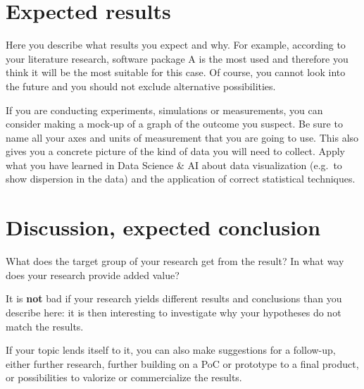 \documentclass[english]{hogent-article}
\begin{document}
\section{Expected results}%
\label{sec:expected-results}


Here you describe what results you expect and why. For example, according to your literature research, software package A is the most used and therefore you think it will be the most suitable for this case. Of course, you cannot look into the future and you should not exclude alternative possibilities.

If you are conducting experiments, simulations or measurements, you can consider making a mock-up of a graph of the outcome you suspect. Be sure to name all your axes and units of measurement that you are going to use. This also gives you a concrete picture of the kind of data you will need to collect. Apply what you have learned in Data Science \& AI about data visualization (e.g.\ to show dispersion in the data) and the application of correct statistical techniques.

\section{Discussion, expected conclusion}%
\label{sec:discussion-conclusion}

What does the target group of your research get from the result? In what way does your research provide added value?

It is \textbf{not} bad if your research yields different results and conclusions than you describe here: it is then interesting to investigate why your hypotheses do not match the results.

If your topic lends itself to it, you can also make suggestions for a follow-up, either further research, further building on a PoC or prototype to a final product, or possibilities to valorize or commercialize the results.


\printbibliography[heading=bibintoc]
\end{document}

